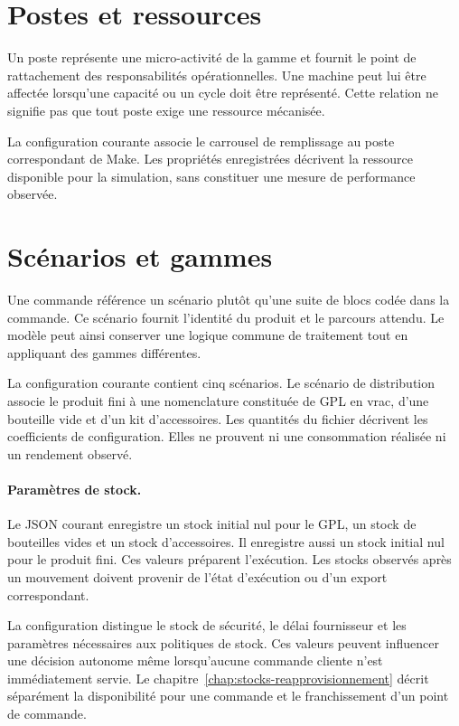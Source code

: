 \section{Postes et ressources}

Un poste représente une micro-activité de la gamme et fournit le point de rattachement des responsabilités opérationnelles. Une machine peut lui être affectée lorsqu'une capacité ou un cycle doit être représenté. Cette relation ne signifie pas que tout poste exige une ressource mécanisée.

La configuration courante associe le carrousel de remplissage au poste correspondant de Make. Les propriétés enregistrées décrivent la ressource disponible pour la simulation, sans constituer une mesure de performance observée.

\section{Scénarios et gammes}

Une commande référence un scénario plutôt qu'une suite de blocs codée dans la commande. Ce scénario fournit l'identité du produit et le parcours attendu. Le modèle peut ainsi conserver une logique commune de traitement tout en appliquant des gammes différentes.

La configuration courante contient cinq scénarios. Le scénario de distribution associe le produit fini à une nomenclature constituée de GPL en vrac, d'une bouteille vide et d'un kit d'accessoires. Les quantités du fichier décrivent les coefficients de configuration. Elles ne prouvent ni une consommation réalisée ni un rendement observé.


\paragraph{Paramètres de stock.}

Le JSON courant enregistre un stock initial nul pour le GPL, un stock de bouteilles vides et un stock d'accessoires. Il enregistre aussi un stock initial nul pour le produit fini. Ces valeurs préparent l'exécution. Les stocks observés après un mouvement doivent provenir de l'état d'exécution ou d'un export correspondant.

La configuration distingue le stock de sécurité, le délai fournisseur et les paramètres nécessaires aux politiques de stock. Ces valeurs peuvent influencer une décision autonome même lorsqu'aucune commande cliente n'est immédiatement servie. Le chapitre~\ref{chap:stocks-reapprovisionnement} décrit séparément la disponibilité pour une commande et le franchissement d'un point de commande.
